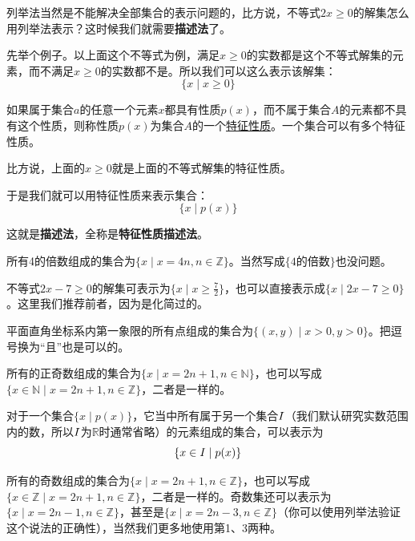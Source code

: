 \documentclass[lang=cn,math=cm,chinesefont=nofont,11pt,scheme=chinese,onecol]{elegantbook}
\begin{document}
列举法当然是不能解决全部集合的表示问题的，比方说，不等式$2x\geq 0$的解集怎么用列举法表示？这时候我们就需要\textbf{描述法}了。

先举个例子。以上面这个不等式为例，满足$x\geq 0$的实数都是这个不等式解集的元素，而不满足$x\geq 0$的实数都不是。所以我们可以这么表示该解集：
$$\{x\mid x\geq0\}$$

\begin{definition}[特征性质]
如果属于集合$a$的任意一个元素$x$都具有性质$p(x)$，而不属于集合$A$的元素都不具有这个性质，则称性质$p(x)$为集合$A$的一个\underline{特征性质}。一个集合可以有多个特征性质。
\end{definition}
比方说，上面的$x\geq 0$就是上面的不等式解集的特征性质。

于是我们就可以用特征性质来表示集合：$$\{x\mid p(x)\}$$

这就是\textbf{描述法}，全称是\textbf{特征性质描述法}。

\begin{example}
  所有4的倍数组成的集合为$\{x\mid x=4n,n\in\mathbb{Z}\}$。当然写成$\{\text{4的倍数}\}$也没问题。
\end{example}

\begin{example}
  不等式$2x-7\geq 0$的解集可表示为$\{x\mid x\geq\frac{7}{2}\}$，也可以直接表示成$\{x\mid 2x-7\geq 0\}$。这里我们推荐前者，因为是化简过的。
\end{example}

\begin{example}
  平面直角坐标系内第一象限的所有点组成的集合为$\{(x,y)\mid x>0,y>0\}$。把逗号换为“且”也是可以的。
\end{example}

\begin{example}
  所有的正奇数组成的集合为$\{x\mid x=2n+1,n\in\mathbb{N}\}$，也可以写成$\{x\in\mathbb{N}\mid x=2n+1,n\in\mathbb{Z}\}$，二者是一样的。
\end{example}

\begin{remark}
  对于一个集合$\{x\mid p(x)\}$，它当中所有属于另一个集合$\boldmath{I}$（我们默认研究实数范围内的数，所以$\boldmath{I}$为$\mathbb{R}$时通常省略）的元素组成的集合，可以表示为$$\{x\in\boldmath{I}\mid p(x)\}$$
\end{remark}

\begin{example}
  \label{exp:1}
  所有的奇数组成的集合为$\{x\mid x=2n+1,n\in\mathbb{Z}\}$，也可以写成$\{x\in\mathbb{Z}\mid x=2n+1,n\in\mathbb{Z}\}$，二者是一样的。奇数集还可以表示为$\{x\mid x=2n-1,n\in\mathbb{Z}\}$，甚至是$\{x\mid x=2n-3,n\in\mathbb{Z}\}$（你可以使用列举法验证这个说法的正确性），当然我们更多地使用第1、3两种。
\end{example}
\end{document}
